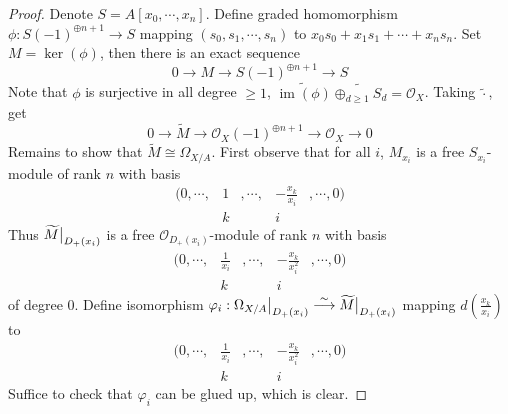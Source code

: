 \documentclass{ctexart}
\newcommand{\im}{\operatorname{im}}
\begin{document}
\begin{proof}
    Denote $S = A[x_{0}, \cdots, x_{n}]$.
    Define graded homomorphism $\phi: S(-1)^{\oplus n + 1} \longrightarrow S$ mapping $(s_{0}, s_{1}, \cdots, s_{n})$ to $x_{0}s_{0} + x_{1}s_{1} + \cdots + x_{n}s_{n}$.
    Set $M = \ker(\phi)$, then there is an exact sequence
    \begin{equation*}
        0 \longrightarrow M \longrightarrow S(-1)^{\oplus n + 1} \longrightarrow S
    \end{equation*}
    Note that $\phi$ is surjective in all degree $\ge 1$, $\widetilde{\im(\phi)}\widetilde{\oplus_{d \ge 1} S_{d}} = \mathcal{O}_{X}$.
    Taking $\widetilde{\cdot}$, get 
    \begin{equation*}
        0 \longrightarrow \widetilde{M} \longrightarrow \mathcal{O}_{X}(-1)^{\oplus n + 1} \longrightarrow \mathcal{O}_{X} \longrightarrow 0
    \end{equation*}
    Remains to show that $\widetilde{M} \cong \Omega_{X/A}$.
    First observe that for all $i$, $M_{x_{i}}$ is a free $S_{x_{i}}$-module of rank $n$ with basis 
    \begin{equation*}
        \begin{aligned}
            (0, \cdots, & 1 & , \cdots, & -\frac{x_{k}}{x_{i}} & , \cdots, 0) \\
            & k && i &
        \end{aligned}
    \end{equation*}
    Thus $\widetilde{M}\big{|}_{D_{+}(x_{i})}$ is a free $\mathcal{O}_{D_{+}(x_{i})}$-module of rank $n$ with basis 
    \begin{equation*}
        \begin{aligned}
            (0, \cdots, & \frac{1}{x_{i}} & , \cdots, & -\frac{x_{k}}{x_{i}^{2}} & , \cdots, 0) \\
            & k && i &
        \end{aligned}
    \end{equation*}
    of degree $0$.
    Define isomorphism $\varphi_{i}: \Omega_{X/A}\big{|}_{D_{+}(x_{i})} \overset{\sim}{\longrightarrow} \widetilde{M}\big{|}_{D_{+}(x_{i})}$ mapping $d(\frac{x_{k}}{x_{i}})$ to 
    \begin{equation*}
        \begin{aligned}
            (0, \cdots, & \frac{1}{x_{i}} & , \cdots, & -\frac{x_{k}}{x_{i}^{2}} & , \cdots, 0) \\
            & k && i &
        \end{aligned}
    \end{equation*}
    Suffice to check that $\varphi_{i}$ can be glued up, which is clear.
\end{proof}
\end{document}
